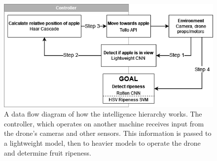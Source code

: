 \begin{figure}[htbp]
    \fontsize{7}{5}\selectfont
    \centering
    \includegraphics[width=\columnwidth,keepaspectratio]
    {./figures/fruit-fly-model-diagram}
    \caption{
        A data flow diagram of how the intelligence hierarchy works.
        The controller, which operates on another machine receives input from the drone's cameras and other sensors.
        This information is passed to a lightweight model, then to heavier models to operate the drone and determine fruit ripeness.
    }
    \label{fig:fruit-fly-model-diagram}
\end{figure}
